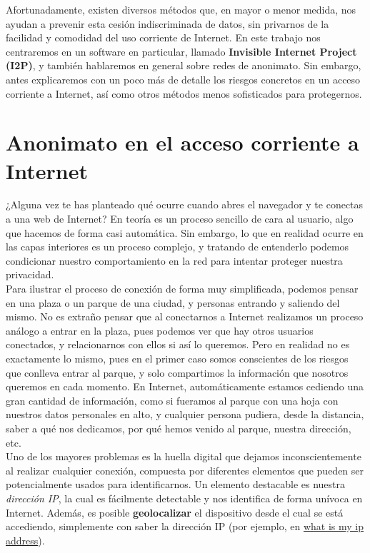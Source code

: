 	Afortunadamente, existen diversos métodos que, en mayor o menor medida, nos ayudan a prevenir esta cesión indiscriminada de datos, sin privarnos de la facilidad y comodidad del uso corriente de Internet. En este trabajo nos centraremos en un software en particular, llamado \textbf{Invisible Internet Project (I2P)}, y también hablaremos en general sobre redes de anonimato. Sin embargo, antes explicaremos con un poco más de detalle los riesgos concretos en un acceso corriente a Internet, así como otros métodos menos sofisticados para protegernos.
	
	
	
	
	\section{Anonimato en el acceso corriente a Internet}
	
	¿Alguna vez te has planteado qué ocurre cuando abres el navegador y te conectas a una web de Internet? En teoría es un proceso sencillo de cara al usuario, algo que hacemos de forma casi automática. Sin embargo, lo que en realidad ocurre en las capas interiores es un proceso complejo, y tratando de entenderlo podemos condicionar nuestro comportamiento en la red para intentar proteger nuestra privacidad.\\
	
	Para ilustrar el proceso de conexión de forma muy simplificada, podemos pensar en una plaza o un parque de una ciudad, y personas entrando y saliendo del mismo. No es extraño pensar que al conectarnos a Internet realizamos un proceso análogo a entrar en la plaza, pues podemos ver que hay otros usuarios conectados, y relacionarnos con ellos si así lo queremos. Pero en realidad no es exactamente lo mismo, pues en el primer caso somos conscientes de los riesgos que conlleva entrar al parque, y solo compartimos la información que nosotros queremos en cada momento. En Internet, automáticamente estamos cediendo una gran cantidad de información, como si fueramos al parque con una hoja con nuestros datos personales en alto, y cualquier persona pudiera, desde la distancia, saber a qué nos dedicamos, por qué hemos venido al parque, nuestra dirección, etc.\\
	
	Uno de los mayores problemas es la huella digital que dejamos inconscientemente al realizar cualquier conexión, compuesta por diferentes elementos que pueden ser potencialmente usados para identificarnos. Un elemento destacable es nuestra \textit{dirección IP}, la cual es fácilmente detectable y nos identifica de forma unívoca en Internet. Además, es posible \textbf{geolocalizar} el dispositivo desde el cual se está accediendo, simplemente con saber la dirección IP (por ejemplo, en \href{https://whatismyipaddress.com/}{\url{what is my ip address}}).\\
	
